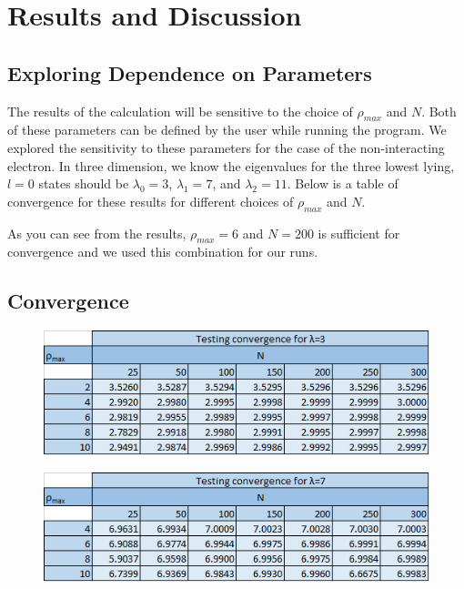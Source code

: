 \documentclass[%
oneside,                 %
final,                   %
10pt]{article}
\begin{document}
\section{Results and Discussion}


\subsection{Exploring Dependence on Parameters}

The results of the calculation will be sensitive to the choice of $\rho_{max}$ and $N$.  Both of these parameters can be defined by the user while running the program.  We explored the sensitivity to these parameters for the case of the non-interacting electron.  In three dimension, we know the eigenvalues for the three lowest lying, $l=0$ states should be $\lambda_0=3$, $\lambda_1=7$, and $\lambda_2=11$.  Below is a table of convergence for these results for different choices of  $\rho_{max}$ and $N$.

As you can see from the results, $\rho_{max}=6$ and $N=200$ is sufficient for convergence and we used this combination for our runs.

\subsection{Convergence}

\begin{figure}[H]\label{fig:3}
  \centering
    \includegraphics[width=1.1\textwidth]{3.png}
\end{figure}

\begin{figure}[H]\label{fig:7}
  \centering
    \includegraphics[width=1.1\textwidth]{7.png}
\end{figure}
\end{document}
